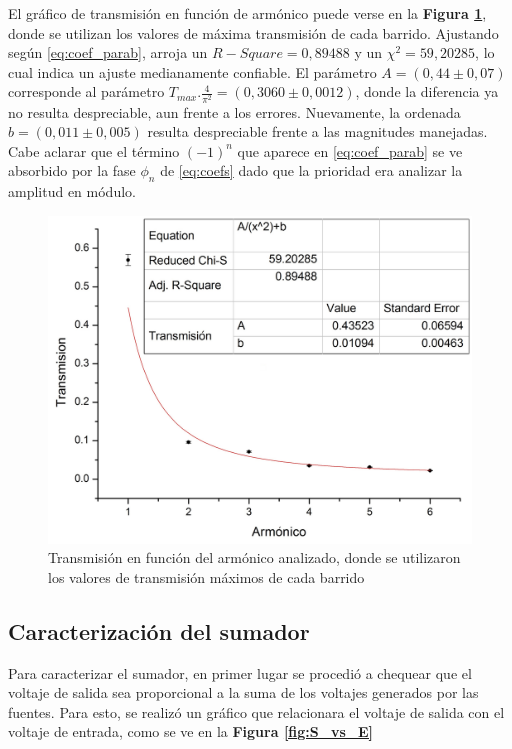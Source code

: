 \documentclass[11pt,a4paper]{article}
\begin{document}
El gráfico de transmisión en función de armónico puede verse en la \textbf{Figura \ref{fig:transparab}}, donde se utilizan los valores de máxima transmisión de cada barrido. Ajustando según \eqref{eq:coef_parab}, arroja un $R-Square = 0,89488$ y un $\chi^2 = 59,20285$, lo cual indica un ajuste medianamente confiable. El parámetro $A = (0,44 \pm 0,07)$ corresponde al parámetro $T_{max}.\frac{4}{\pi^2} = (0,3060 \pm 0,0012)$, donde la diferencia ya no resulta despreciable, aun frente a los errores. Nuevamente, la ordenada $b = (0,011 \pm 0,005)$ resulta despreciable frente a las magnitudes manejadas. Cabe aclarar que el término $(-1)^n$ que aparece en \eqref{eq:coef_parab} se ve absorbido por la fase $\phi_n$ de \eqref{eq:coefs} dado que la prioridad era analizar la amplitud en módulo. 

\begin{figure}[h]
\centering
\includegraphics[scale=0.35]{Trans_vs_Arm_Parab}
\caption{Transmisión en función del armónico analizado, donde se utilizaron los valores de transmisión máximos de cada barrido}
\label{fig:transparab}
\end{figure}

\subsection{Caracterización del sumador}

Para caracterizar el sumador, en primer lugar se procedió a chequear que el voltaje de salida sea proporcional a la suma de los voltajes generados por las fuentes. Para esto, se realizó un gráfico que relacionara el voltaje de salida con el voltaje de entrada, como se ve en la \textbf{Figura \ref{fig:S_vs_E}}
\end{document}
